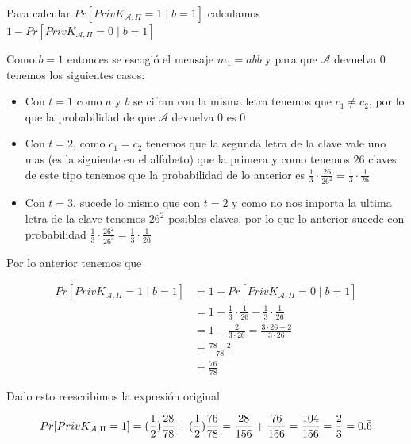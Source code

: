 \documentclass[11pt]{article}
\begin{document}
        
        Para calcular $Pr[PrivK_{\mathcal{A},\Pi} = 1 \mid b = 1]$ calculamos $ 1 - Pr[PrivK_{\mathcal{A},\Pi} = 0 \mid b = 1]$
        
        Como $b = 1$ entonces se escogió el mensaje $m_1 = abb$ y para que $\mathcal{A}$ devuelva $0$ tenemos los siguientes casos:
        
        \begin{itemize}
            \item Con $t = 1$ como $a$ y $b$ se cifran con la misma letra tenemos que $c_1 \neq c_2$, por lo que la probabilidad de que $\mathcal{A}$ devuelva $0$ es $0$
            
            \item Con $t = 2$, como $c_1 = c_2$ tenemos que la segunda letra de la clave vale uno mas (es la siguiente en el alfabeto) que la primera y como tenemos $26$ claves de este tipo tenemos que la probabilidad de lo anterior es  $\frac{1}{3} \cdot \frac{26}{26^2} = \frac{1}{3} \cdot \frac{1}{26}$
            
            
            \item Con $t = 3$, sucede lo mismo que con $t = 2$ y como no nos importa la ultima letra de la clave tenemos $26^2$ posibles claves, por lo que lo anterior sucede con probabilidad $\frac{1}{3} \cdot \frac{26^2}{26^3} = \frac{1}{3} \cdot \frac{1}{26}$
        \end{itemize}
        
        Por lo anterior tenemos que 
        
        \begin{align*}
            Pr[PrivK_{\mathcal{A},\Pi} = 1 \mid b = 1] &= 1 - Pr[PrivK_{\mathcal{A},\Pi} = 0 \mid b = 1]\\ 
            &= 1 - \frac{1}{3} \cdot \frac{1}{26} - \frac{1}{3} \cdot \frac{1}{26}\\
            &= 1 - \frac{2}{3 \cdot 26} = \frac{3\cdot 26 - 2}{3 \cdot 26} \\
            &= \frac{78 - 2}{78} \\
            &= \frac{76}{78}
        \end{align*}
        
        Dado esto reescribimos la expresión original
        
         \begin{equation}
            Pr[PrivK_{\mathcal{A},\Pi} = 1] = (\frac{1}{2}) \frac{28}{78} +  (\frac{1}{2})\frac{76}{78} = \frac{28}{156} + \frac{76}{156} = \frac{104}{156} = \frac{2}{3} = 0.\Bar{6}
        \end{equation}
        
\end{document}
